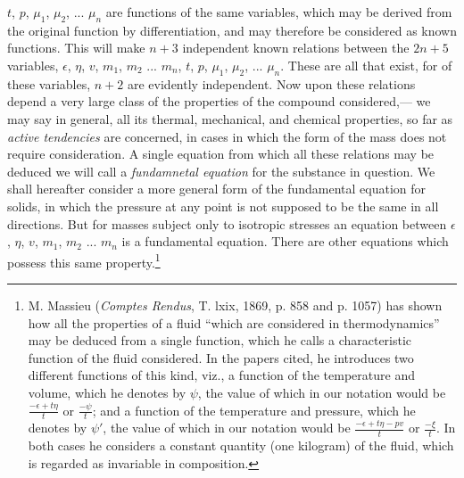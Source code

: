 \documentclass[12pt]{article}
\begin{document}
$t$, $p$, $\mu_1$, $\mu_2$,  ... $\mu_n$ are functions of the same variables, which may be derived from the original function by differentiation, and may therefore be considered as known functions. This will make $n+3$ independent known relations between the $2n+5$ variables, $\epsilon$, $\eta$, $v$, $m_1$, $m_2$ ... $m_n$, $t$, $p$, $\mu_1$, $\mu_2$,  ... $\mu_n$. These are all that exist, for of these variables, $n +2$ are evidently independent.  Now upon these relations depend a very large class of the properties of the compound considered,--- we may say in general, all its thermal, mechanical, and chemical properties, so far as \textit{active tendencies} are concerned, in cases in which the form of the mass does not require consideration. A single equation from which all these relations may be deduced we will call a \textit{fundamnetal equation} for the substance in question. We shall hereafter consider a more general form of the fundamental equation for solids, in which the pressure at any point is not supposed to be the same in all directions. But for masses subject only to isotropic stresses an equation between $\epsilon$, $\eta$, $v$, $m_1$, $m_2$ ... $m_n$ is a fundamental equation.  There are other equations which possess this same property.\footnote{M. Massieu (\textit{Comptes Rendus}, T. lxix, 1869, p. 858 and p. 1057) has shown how all the properties of a fluid ``which are considered in thermodynamics'' may be deduced from a single function, which he calls a characteristic function of the fluid considered. In the papers cited, he introduces two different functions of this kind, viz., a function of the temperature and volume, which he denotes by $\psi$, the value of which in our
notation would be $\frac{-\epsilon + t\eta}{t}$ or $\frac{-\psi}{t}$; and a function of the temperature and pressure, which he denotes by $\psi'$, the value of which in our notation would be $\frac{-\epsilon + t\eta-pv}{t}$ or $\frac{-\xi}{t}$. In both cases he considers a constant quantity (one kilogram) of the fluid, which is regarded as invariable in composition.}
\end{document}
